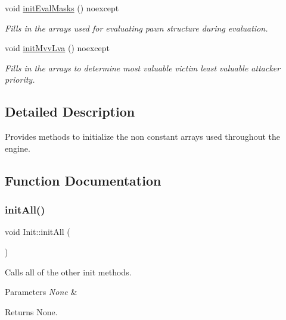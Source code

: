 \begin{DoxyCompactItemize}
void \mbox{\hyperlink{namespaceInit_a836df13b70275ee90841a157d0e380dd}{init\+Eval\+Masks}} () noexcept
\begin{DoxyCompactList}\small\item\em Fills in the arrays used for evaluating pawn structure during evaluation. \end{DoxyCompactList}\item 
void \mbox{\hyperlink{namespaceInit_a87c48a69ce4bce6bd35619d9e9f8aee5}{init\+Mvv\+Lva}} () noexcept
\begin{DoxyCompactList}\small\item\em Fills in the arrays to determine most valuable victim least valuable attacker priority. \end{DoxyCompactList}\end{DoxyCompactItemize}


\subsection{Detailed Description}
Provides methods to initialize the non constant arrays used throughout the engine. 

\subsection{Function Documentation}
\mbox{\label{namespaceInit_a1f7b3ccd301db5369963fb7a9bd86d42}} 
\subsubsection{\texorpdfstring{init\+All()}{initAll()}}
{\footnotesize\ttfamily void Init\+::init\+All (\begin{DoxyParamCaption}{ }\end{DoxyParamCaption})\hspace{0.3cm}{\ttfamily [noexcept]}}



Calls all of the other \textquotesingle{}init\textquotesingle{} methods. 


\begin{DoxyParams}{Parameters}
{\em None} & \\
\hline
\end{DoxyParams}
\begin{DoxyReturn}{Returns}
None. 
\end{DoxyReturn}


